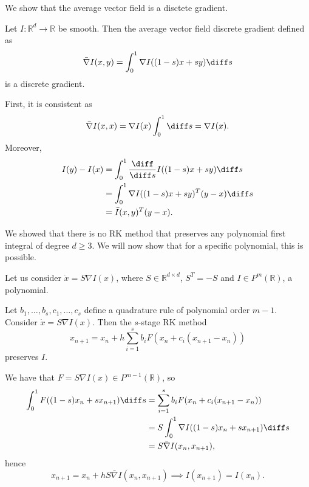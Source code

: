 \documentclass[12pt]{article}
\begin{document}

We show that the average vector field is a disctete gradient.

\begin{proposition}
	Let $I : \mathbb{R}^{d} \to \mathbb{R}$ be smooth. Then the average vector field discrete gradient defined as
	\[
	\bar \nabla I(x, y) = \int_0^{1} \nabla I((1 - s) x + s y) \diff s
	\]
	is a discrete gradient.
\end{proposition}

\begin{proofbox}
	First, it is consistent as
	\[
	\bar \nabla I(x, x) = \nabla I(x) \int_0^{1} \diff s = \nabla I(x).
	\]
	Moreover,
	\begin{align*}
		I(y) - I(x) &= \int_0^{1} \frac{\diff}{\diff s} I((1 - s)x + s y)\diff s \\
			    &= \int_0^{1} \nabla I((1 - s)x + s y)^{T} (y - x) \diff s \\
			    &= \bar I(x, y)^{T}(y - x).
	\end{align*}
\end{proofbox}

We showed that there is no RK method that preserves any polynomial first integral of degree $d \geq 3$. We will now show that for a specific polynomial, this is possible.

Let us consider $\dot x = S \nabla I(x)$, where $S \in \mathbb{R}^{d \times d}$, $S^{T} = -S$ and $I \in P^{m}(\mathbb{R})$, a polynomial.

\begin{proposition}
	Let $b_1, \ldots, b_s, c_1, \ldots, c_s$ define a quadrature rule of polynomial order $m-1$. Consider $\dot x = S \nabla I(x)$. Then the $s$-stage RK method
	\[
	x_{n+1} = x_n + h \sum_{i = 1}^{s} b_i F(x_n + c_i(x_{n+1} - x_n))
	\]
	preserves $I$.
\end{proposition}

\begin{proofbox}
	We have that $F = S \nabla I(x) \in P^{m-1}(\mathbb{R})$, so
	\begin{align*}
		\int_0^{1} F((1 - s) x_n + s x_{n+1}) \diff s &= \sum_{i = 1}^{s} b_i F(x_n + c_i(x_{n+1} - x_n))\\
							      &= S\int_0^{1} \nabla I((1 - s) x_n + s x_{n+1}) \diff s \\
							      &= S \bar \nabla I(x_n, x_{n+1}),
	\end{align*}
	hence
	\[
	x_{n+1} = x_n + h S \bar \nabla I(x_n, x_{n+1}) \implies I(x_{n+1}) = I(x_n).
	\]
\end{proofbox}
\end{document}
